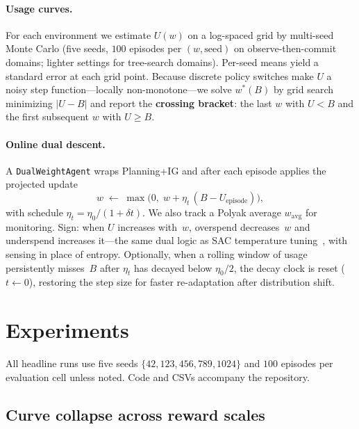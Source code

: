 \documentclass[runningheads]{llncs}
\begin{document}
\paragraph{Usage curves.}
For each environment we estimate $U(w)$ on a log-spaced grid by multi-seed Monte Carlo (five seeds, $100$ episodes per $(w,\mathrm{seed})$ on observe-then-commit domains; lighter settings for tree-search domains). Per-seed means yield a standard error at each grid point. Because discrete policy switches make $U$ a noisy step function---locally non-monotone---we solve $w^*(B)$ by grid search minimizing $|U-B|$ and report the \textbf{crossing bracket}: the last $w$ with $U<B$ and the first subsequent $w$ with $U\ge B$.

\paragraph{Online dual descent.}
A \texttt{DualWeightAgent} wraps Planning+IG and after each episode applies the projected update
\begin{equation}
\label{eq:dual}
w \;\leftarrow\; \max\bigl(0,\; w + \eta_t\,(B - U_{\mathrm{episode}})\bigr),
\end{equation}
with schedule $\eta_t=\eta_0/(1+\delta t)$. We also track a Polyak average $w_{\mathrm{avg}}$ for monitoring. Sign: when $U$ increases with~$w$, overspend decreases~$w$ and underspend increases it---the same dual logic as SAC temperature tuning~\citep{haarnoja2018sac}, with sensing in place of entropy. Optionally, when a rolling window of usage persistently misses~$B$ after $\eta_t$ has decayed below $\eta_0/2$, the decay clock is reset ($t\leftarrow 0$), restoring the step size for faster re-adaptation after distribution shift.

\section{Experiments}
\label{sec:experiments}

All headline runs use five seeds $\{42,123,456,789,1024\}$ and $100$ episodes per evaluation cell unless noted. Code and CSVs accompany the repository.

\subsection{Curve collapse across reward scales}
\label{sec:collapse}
\end{document}

